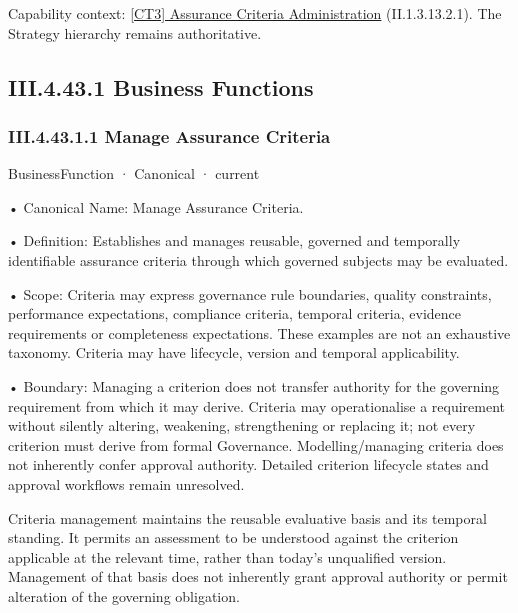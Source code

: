 {\small Capability context: \hyperref[element:1bfd71f24321428c8871b587d413f47e]{[CT3] Assurance Criteria Administration} (II.1.3.13.2.1). The Strategy hierarchy remains authoritative.}\par
\subsection*{III.4.43.1 Business Functions}
\label{navigation:III.4.43.1}

\subsubsection*{III.4.43.1.1 Manage Assurance Criteria}
\label{navigation:III.4.43.1.1}

\label{element:d7e9ba5addd94db2bce164c7c9809e4e}
{\small BusinessFunction · Canonical · current}\par

•
Canonical Name: Manage Assurance Criteria.



•
Definition: Establishes and manages reusable, governed and temporally identifiable assurance criteria through which governed subjects may be evaluated.



•
Scope: Criteria may express governance rule boundaries, quality constraints, performance expectations, compliance criteria, temporal criteria, evidence requirements or completeness expectations. These examples are not an exhaustive taxonomy. Criteria may have lifecycle, version and temporal applicability.



•
Boundary: Managing a criterion does not transfer authority for the governing requirement from which it may derive. Criteria may operationalise a requirement without silently altering, weakening, strengthening or replacing it; not every criterion must derive from formal Governance. Modelling/managing criteria does not inherently confer approval authority. Detailed criterion lifecycle states and approval workflows remain unresolved.



Criteria management maintains the reusable evaluative basis and its temporal standing. It permits an assessment to be understood against the criterion applicable at the relevant time, rather than today's unqualified version. Management of that basis does not inherently grant approval authority or permit alteration of the governing obligation.


